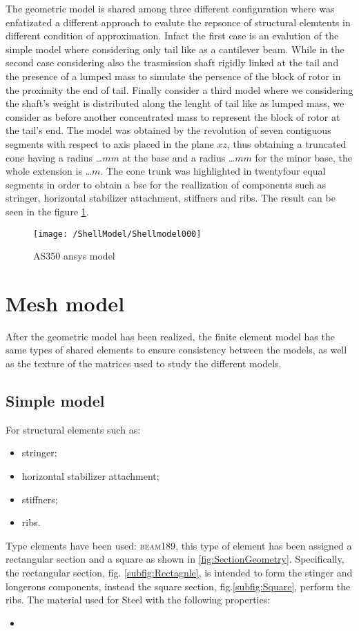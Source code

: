 The geometric model is shared among three different configuration where was enfatizated a different approach to evalute the repsonce of structural elemtents in different condition of approximation. Infact the first case is an evalution of the simple model where considering only tail like as a cantilever beam. 
While in the second case considering also the trasmission shaft rigidly linked at the tail and the presence of a lumped mass to simulate the persence of the block of rotor in the proximity the end of tail. 
Finally consider a third model where we considering the shaft's weight is distributed along the lenght of tail like as lumped mass, we consider as before another concentrated mass to represent the block of rotor at the tail's end.
The model was obtained by the revolution of seven contiguous segments with respect to axis placed in the plane $xz$, thus obtaining a truncated cone having a radius \dots $mm$ at the base and a radius \dots $mm$ for the minor base, the whole extension is \dots $m$.
The cone trunk was highlighted in twentyfour equal segments in order to obtain a bse for the reallization of components such as stringer, horizontal stabilizer attachment, stiffners and ribs.
The result can be seen in the figure \ref{fig:Ansys1}.

\begin{figure}[htb]
\centering
\texttt{[image: /ShellModel/Shellmodel000]}
\caption{AS350 ansys model}
\label{fig:Ansys1}
\end{figure}

\section{Mesh model}
After the geometric model has been realized, the finite element model has the same types of shared elements to ensure consistency between the models, as well as the texture of the matrices used to study the different models.
\subsection{Simple model}
For structural elements such as:
\begin{itemize}
\item stringer;
\item horizontal stabilizer attachment;
\item stiffners;
\item ribs.
\end{itemize}
Type elements have been used: \textsc{beam189}, this type of element has been assigned a rectangular section and a square as shown in \ref{fig:SectionGeometry}. Specifically, the rectangular section, fig. \ref{subfig:Rectagnle}, is intended to form the stinger and longerons components, instead the square section, fig.\ref{subfig:Square}, perform the ribs.
The material used for Steel with the following properties:
\begin{itemize}
\item
\end{itemize}

